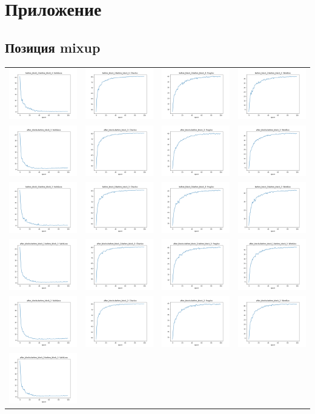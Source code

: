 \section*{Приложение}
\label{sec:Apendix} 

\subsection{Позиция mixup}

\begin{longtable}{cccc}
\centering
\includegraphics[scale=0.2]{./images/mixup_position/before_block_2;before_block_4_ValidLoss.png} & \includegraphics[scale=0.2]{./images/mixup_position/before_block_2;before_block_4_CharAcc.png} & \includegraphics[scale=0.2]{./images/mixup_position/before_block_2;before_block_4_FragAcc.png} & \includegraphics[scale=0.2]{./images/mixup_position/before_block_2;before_block_4_WordAcc.png}\\
\includegraphics[scale=0.2]{./images/mixup_position/after_blocks;before_block_3_ValidLoss.png} & \includegraphics[scale=0.2]{./images/mixup_position/after_blocks;before_block_3_CharAcc.png} & \includegraphics[scale=0.2]{./images/mixup_position/after_blocks;before_block_3_FragAcc.png} & \includegraphics[scale=0.2]{./images/mixup_position/after_blocks;before_block_3_WordAcc.png}\\
\includegraphics[scale=0.2]{./images/mixup_position/before_block_0;before_block_3_ValidLoss.png} & \includegraphics[scale=0.2]{./images/mixup_position/before_block_0;before_block_3_CharAcc.png} & \includegraphics[scale=0.2]{./images/mixup_position/before_block_0;before_block_3_FragAcc.png} & \includegraphics[scale=0.2]{./images/mixup_position/before_block_0;before_block_3_WordAcc.png}\\
\includegraphics[scale=0.2]{./images/mixup_position/after_blocks;before_block_1;before_block_3_ValidLoss.png} & \includegraphics[scale=0.2]{./images/mixup_position/after_blocks;before_block_1;before_block_3_CharAcc.png} & \includegraphics[scale=0.2]{./images/mixup_position/after_blocks;before_block_1;before_block_3_FragAcc.png} & \includegraphics[scale=0.2]{./images/mixup_position/after_blocks;before_block_1;before_block_3_WordAcc.png}\\
\includegraphics[scale=0.2]{./images/mixup_position/after_blocks;before_block_2_ValidLoss.png} & \includegraphics[scale=0.2]{./images/mixup_position/after_blocks;before_block_2_CharAcc.png} & \includegraphics[scale=0.2]{./images/mixup_position/after_blocks;before_block_2_FragAcc.png} & \includegraphics[scale=0.2]{./images/mixup_position/after_blocks;before_block_2_WordAcc.png}\\
\includegraphics[scale=0.2]{./images/mixup_position/after_blocks;before_block_0;before_block_3_ValidLoss.png} & 
\end{longtable}
